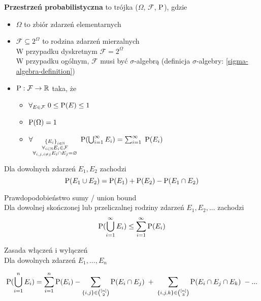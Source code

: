 \begin{definition}
	\textbf{Przestrzeń probabilistyczna} to trójka (\(\Omega\), \(\mathcal{F}\), \(\operatorname{P}\)), gdzie
	\begin{itemize}
		\item \(\Omega\) to zbiór zdarzeń elementarnych
		\item \(\mathcal{F} \subseteq 2^{\Omega}\) to rodzina zdarzeń mierzalnych\\
		W przypadku dyskretnym \(\mathcal{F} = 2^{\Omega}\)\\
		W przypadku ogólnym, \(\mathcal{F}\) musi być \(\sigma\)-algebrą (definicja \(\sigma\)-algebry: \ref{sigma-algebra-definition})
		\item \(\operatorname{P} : \mathcal{F} \to \mathbb{R}\) taka, że
		\begin{itemize}
			\item \(\forall_{E \in \mathcal{F}} \; 0 \leq \operatorname{P}(E) \leq 1\)
			\item \(\operatorname{P}(\Omega) = 1\)
			\item \(\forall_{\substack{\set{E_i}_{i \in \natural} \\ \forall_{i \in \natural} E_i \in \mathcal{F} \\ \forall_{i, j, i \not= j} E_i \cap E_j = \emptyset}} \; \prob(\bigcup_{i=1}^\infty E_i) = \sum_{i=1}^\infty \; \prob(E_i)\)
		\end{itemize}
	\end{itemize}
\end{definition}

\begin{lemma}
	Dla dowolnych zdarzeń \(E_1, E_2\) zachodzi
	\[
		\operatorname{P}(E_1 \cup E_2) = \operatorname{P}(E_1) + \operatorname{P}(E_2) - \operatorname{P}(E_1 \cap E_2)
	\]
\end{lemma} 

\begin{lemma} Prawdopodobieństwo sumy / union bound \\
	\label{union-bound}
	Dla dowolnej skończonej lub przeliczalnej rodziny zdarzeń \(E_1, E_2, ...\) zachodzi
	\[
		\operatorname{P}(\bigcup_{i=1}^\infty E_i) \leq \sum_{i=1}^\infty \operatorname{P}(E_i)
	\]
\end{lemma}

\begin{lemma} Zasada włączeń i wyłączeń \\
	Dla dowolnych zdarzeń \(E_1, ..., E_n\)
	
	\[
		\operatorname{P}(\bigcup_{i=1}^n E_i) = \sum_{i=1}^n \operatorname{P}(E_i) - \sum_{\{i,j\} \in \binom{[n]}{2}} \operatorname{P}(E_i \cap E_j) \; + \; \sum_{\{i,j,k\} \in \binom{[n]}{3}} \operatorname{P}(E_i \cap E_j \cap E_k) \; - ...
	\]
\end{lemma}

